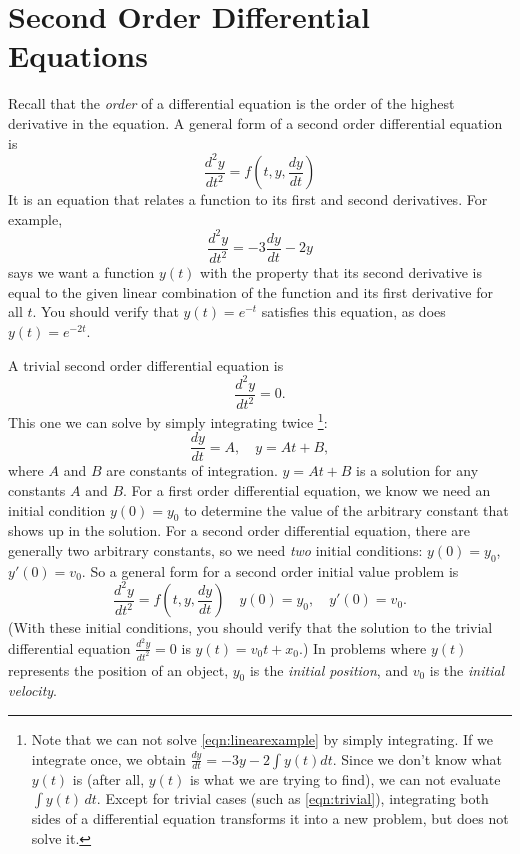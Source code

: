 \documentclass[reqno]{immbook}
\numberwithin{equation}{chapter}
\numberwithin{question}{section}
\numberwithin{theorem}{chapter}
\numberwithin{figure}{chapter}
\theoremstyle{definition}
\begin{document}
\section{Second Order Differential Equations}
Recall that the \emph{order} of a differential equation
is the order of the highest derivative in the equation.
A general form of a second order differential equation is
\begin{equation}
   \frac{d^2y}{dt^2} = f\left(t,y,\frac{dy}{dt}\right)
\label{eqn:generalsecondorder}
\end{equation}
It is an equation that relates a function to its first
and second derivatives.  For example,
\begin{equation}
  \frac{d^2y}{dt^2} = -3\frac{dy}{dt}-2y
  \label{eqn:linearexample} 
\end{equation}
says we want a function $y(t)$ with the property that its second derivative
is equal to the given linear combination of the function and  its first derivative
for all $t$.  You should verify that $y(t)=e^{-t}$ satisfies this equation,
as does $y(t) = e^{-2t}$.

A trivial second order differential equation is
\begin{equation}
   \frac{d^2y}{dt^2} = 0.
   \label{eqn:trivial}
\end{equation}
This one we can solve by simply integrating twice%
\footnote{Note that we can not solve \eqref{eqn:linearexample}
by simply integrating. If we integrate once, we obtain
$\frac{dy}{dt} = -3y -2\int y(t)dt$.  Since we don't know what
$y(t)$ is (after all, $y(t)$ is what we are trying to find), we can not
evaluate $\int y(t)\,dt$.  Except for trivial cases
(such as \eqref{eqn:trivial}),
integrating both sides of a differential
equation transforms it into a new problem, but does not solve it.}:
\begin{equation}
  \frac{dy}{dt} = A, \quad y = At+B,
\end{equation}
where $A$ and $B$ are constants of integration.
$y=At+B$ is a solution for any constants $A$ and $B$.
For a first order differential equation, we know we need
an initial condition $y(0)=y_0$ to determine the value of the
arbitrary constant that shows up in the solution.  For a second order
differential equation, there are generally two arbitrary constants, so
we need \emph{two} initial conditions: $y(0)=y_0$, $y'(0) = v_0$.
So a general form for a second order initial value problem is
\begin{equation}
   \frac{d^2y}{dt^2} = f\left(t,y,\frac{dy}{dt}\right)
  \quad y(0) = y_0, \quad y'(0)=v_0.
\end{equation}
(With these initial conditions, you should verify that the solution
to the trivial differential equation $\frac{d^2y}{dt^2}=0$ is $y(t)=v_0 t + x_0$.)
In problems where $y(t)$ represents the position of an object,
$y_0$ is the \emph{initial position}, and $v_0$ is the
\emph{initial velocity}.
\end{document}
